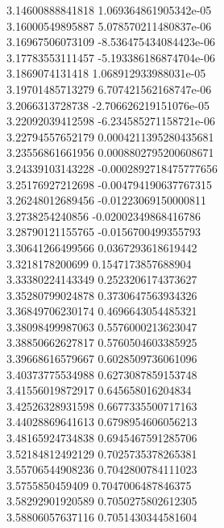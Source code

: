 {3.14600888841818 1.069364861905342e-05 \\
3.16000549895887 5.078570211480837e-06 \\
3.16967506073109 -8.536475434084423e-06 \\
3.17783553111457 -5.193386186874704e-06 \\
3.1869074131418 1.068912933988031e-05 \\
3.19701485713279 6.707421562168747e-06 \\
3.2066313728738 -2.706626219151076e-05 \\
3.22092039412598 -6.234585271158721e-06 \\
3.22794557652179 0.0004211395280435681 \\
3.23556861661956 0.0008802795200608671 \\
3.24339103143228 -0.0002892718475777656 \\
3.25176927212698 -0.004794190637767315 \\
3.26248012689456 -0.01223069150000811 \\
3.2738254240856 -0.02002349868416786 \\
3.28790121155765 -0.0156700499355793 \\
3.30641266499566 0.0367293618619442 \\
3.3218178200699 0.1547173857688904 \\
3.33380224143349 0.2523206174373627 \\
3.35280799024878 0.3730647563934326 \\
3.36849706230174 0.4696643054485321 \\
3.38098499987063 0.5576000213623047 \\
3.38850662627817 0.5760504603385925 \\
3.39668616579667 0.6028509736061096 \\
3.40373775534988 0.6273087859153748 \\
3.41556019872917 0.645658016204834 \\
3.42526328931598 0.6677335500717163 \\
3.44028869641613 0.6798954606056213 \\
3.48165924734838 0.6945467591285706 \\
3.52184812492129 0.7025735378265381 \\
3.55706544908236 0.7042800784111023 \\
3.5755850459409 0.7047006487846375 \\
3.58292901920589 0.7050275802612305 \\
3.58806057637116 0.7051430344581604 \\
}
